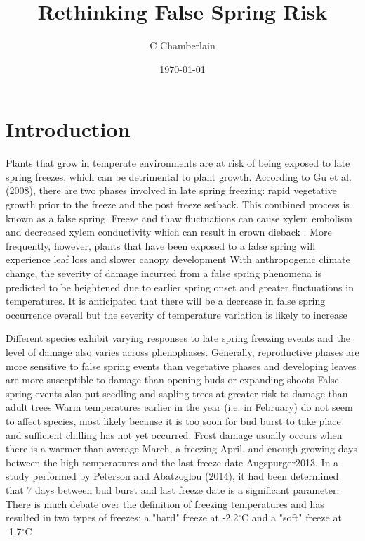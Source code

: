 \documentclass{article}\usepackage[]{graphicx}\usepackage[]{color}
\begin{document}
\title{Rethinking False Spring Risk}
\author{C Chamberlain}
\date{\today}
\maketitle 

\renewcommand{\thetable}{\arabic{table}}
\renewcommand{\thefigure}{\arabic{figure}}
\renewcommand{\labelitemi}{$-$}
\section*{Introduction}

Plants that grow in temperate environments are at risk of being exposed to late spring freezes, which can be detrimental to plant growth. According to Gu et al. (2008), there are two phases involved in late spring freezing: rapid vegetative growth prior to the freeze and the post freeze setback. This combined process is known as a false spring. Freeze and thaw fluctuations can cause xylem embolism and decreased xylem conductivity which can result in crown dieback \cite{Gu2008}.
More frequently, however, plants that have been exposed to a false spring will experience leaf loss and slower canopy development %
With anthropogenic climate change, the severity of damage incurred from a false spring phenomena is predicted to be heightened due to earlier spring onset and greater fluctuations in temperatures. It is anticipated that there will be a decrease in false spring occurrence overall but the severity of temperature variation is likely to increase %

Different species exhibit varying responses to late spring freezing events and the level of damage also varies across phenophases. Generally, reproductive phases are more sensitive to false spring events than vegetative phases and developing leaves are more susceptible to damage than opening buds or expanding shoots %
False spring events also put seedling and sapling trees at greater risk to damage than adult trees %
Warm temperatures earlier in the year (i.e. in February) do not seem to affect species, most likely because it is too soon for bud burst to take place and sufficient chilling has not yet occurred. Frost damage usually occurs when there is a warmer than average March, a freezing April, and enough growing days between the high temperatures and the last freeze date {Augspurger2013}. In a study performed by Peterson and Abatzoglou (2014), it had been determined that 7 days between bud burst and last freeze date is a significant parameter. There is much debate over the definition of freezing temperatures and has resulted in two types of freezes: a "hard" freeze at -2.2$^{\circ}$C and a "soft" freeze at -1.7$^{\circ}$C %
\end{document}
